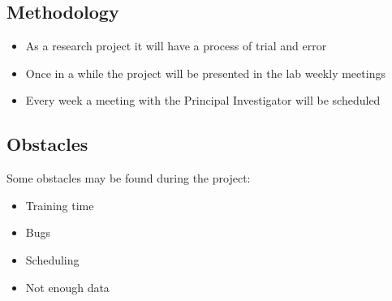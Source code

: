 \subsection{Methodology}
\begin{frame}{\insertsubsec}
  \begin{itemize}
    \item As a research project it will have a process of trial and error
    \item Once in a while the project will be presented in the lab weekly meetings
    \item Every week a meeting with the Principal Investigator will be scheduled
  \end{itemize}
\end{frame}

\subsection{Obstacles}
\begin{frame}{\insertsubsec}
  Some obstacles may be found during the project:

  \begin{itemize}
    \item Training time
    \item Bugs
    \item Scheduling
    \item Not enough data
  \end{itemize}
\end{frame}
